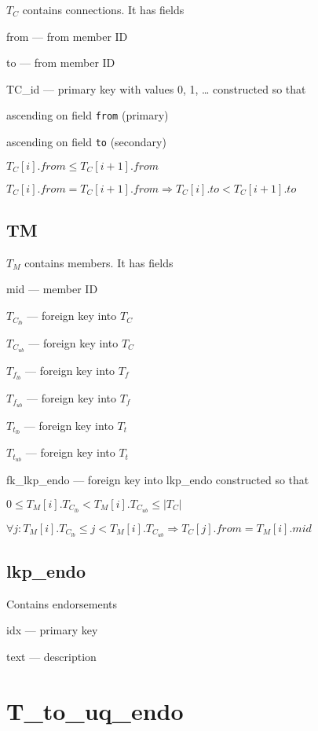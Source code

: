 \(T_C\) contains connections. It has fields
\be
\item from --- from member ID 
\item   to --- from member ID 
\item TC\_id --- primary key with values 0, 1, \ldots
\ee
constructed so that 
\be
\item ascending on field {\tt from} (primary)
\item ascending on field {\tt to} (secondary)
\item \(T_C[i].from \leq T_C[i+1].from\)
\item \(T_C[i].from = T_C[i+1].from \Rightarrow
T_C[i].to < T_C[i+1].to\)
\ee

\subsection{TM}
\label{T_M}

\(T_M\) contains members. It has fields
\be
\item mid --- member ID
\item \(T_{C_{lb}}\) --- foreign key into \(T_C\)
\item \(T_{C_{ub}}\) --- foreign key into \(T_C\)
\item \(T_{f_{lb}}\) --- foreign key into \(T_f\)
\item \(T_{f_{ub}}\) --- foreign key into \(T_f\)
\item \(T_{t_{lb}}\) --- foreign key into \(T_t\)
\item \(T_{t_{ub}}\) --- foreign key into \(T_t\)
\item fk\_lkp\_endo --- foreign key into lkp\_endo
\ee
constructed so that 
\be
\item \(0 \leq T_M[i].T_{C_{lb}} < T_M[i].T_{C_{ub}} \leq |T_C|\)
\item \(\forall j: T_M[i].T_{C_{lb}} \leq j < T_M[i].T_{C_{ub}}
\Rightarrow T_C[j].from = T_M[i].mid\)
\ee

\subsection{lkp\_endo}
\label{lkp_endo}

Contains endorsements 
\be
\item idx --- primary key 
\item text --- description
\ee

\section{T\_to\_uq\_endo}
\label{T_to_uq_endo}

